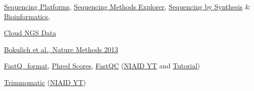 \documentclass[
]{book}
\begin{document}
\begin{longtable}[]
\href{https://www.illumina.com/systems/sequencing-platforms.html}{Sequencing Platforms}, \href{https://www.illumina.com/science/sequencing-method-explorer.html}{Sequencing Methods Explorer}, \href{https://www.illumina.com/science/technology/next-generation-sequencing/sequencing-technology.html}{Sequencing by Synthesis} & \href{https://www.illumina.com/informatics.html}{Bioinformatics},

\href{https://www.illumina.com/informatics/infrastructure-pipeline-setup/genomic-data-storage-security.html}{Cloud NGS Data}

\href{https://doi.org/10.1038/nmeth.2276}{Bokulich et al., Nature Methods 2013}

\href{https://en.wikipedia.org/wiki/FASTQ_format}{FastQ\_format}, \href{https://www.illumina.com/science/technology/next-generation-sequencing/plan-experiments/quality-scores.html}{Phred Scores}, \href{https://www.bioinformatics.babraham.ac.uk/projects/fastqc/}{FastQC} (\href{https://www.youtube.com/watch?v=GnWSXwQeJ_U}{NIAID YT} and \href{https://www.hadriengourle.com/tutorials/qc/}{Tutorial})

\href{https://github.com/timflutre/trimmomatic}{Trimmomatic} (\href{https://www.youtube.com/watch?v=xZbzPpW0NTk}{NIAID YT}) \\
\end{longtable}

  
\end{document}
